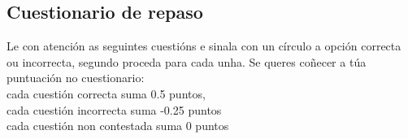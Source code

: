 %
%
%
%
%
%
%
%
%
%
\hideanswers
%
%
\begin{center}
\section*{Cuestionario de repaso}\label{sec:cuestionario-1}
\end{center}

\begin{minipage}{0.85\linewidth}

 Le con atención as seguintes cuestións e sinala con un círculo a opción correcta ou incorrecta, segundo proceda para cada unha.
 Se queres coñecer a túa puntuación no cuestionario:\\
 cada cuestión correcta suma 0.5 puntos,\\
 cada cuestión incorrecta suma -0.25 puntos\\
 cada cuestión non contestada suma 0 puntos \\
%
\par
\hrulefill
\end{minipage}

